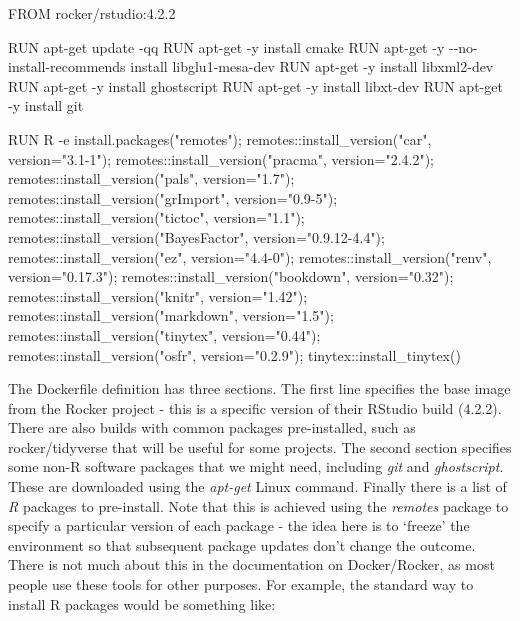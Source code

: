 \documentclass[
]{article}
\newenvironment{Shaded}{\begin{snugshade}}{\end{snugshade}}
\newcommand{\AttributeTok}[1]{\textcolor[rgb]{0.77,0.63,0.00}{#1}}
\newcommand{\ExtensionTok}[1]{#1}
\newcommand{\NormalTok}[1]{#1}
\newcommand{\StringTok}[1]{\textcolor[rgb]{0.31,0.60,0.02}{#1}}
\begin{document}
\begin{Shaded}
\begin{Highlighting}[]

\ExtensionTok{FROM}\NormalTok{ rocker/rstudio:4.2.2}

\ExtensionTok{RUN}\NormalTok{ apt{-}get update }\AttributeTok{{-}qq}
\ExtensionTok{RUN}\NormalTok{ apt{-}get }\AttributeTok{{-}y}\NormalTok{ install cmake}
\ExtensionTok{RUN}\NormalTok{ apt{-}get }\AttributeTok{{-}y} \AttributeTok{{-}{-}no{-}install{-}recommends}\NormalTok{ install libglu1{-}mesa{-}dev}
\ExtensionTok{RUN}\NormalTok{ apt{-}get }\AttributeTok{{-}y}\NormalTok{ install libxml2{-}dev}
\ExtensionTok{RUN}\NormalTok{ apt{-}get }\AttributeTok{{-}y}\NormalTok{ install ghostscript}
\ExtensionTok{RUN}\NormalTok{ apt{-}get }\AttributeTok{{-}y}\NormalTok{ install libxt{-}dev}
\ExtensionTok{RUN}\NormalTok{ apt{-}get }\AttributeTok{{-}y}\NormalTok{ install git}

\ExtensionTok{RUN}\NormalTok{ R }\AttributeTok{{-}e} \StringTok{\textquotesingle{}install.packages("remotes"); remotes::install\_version("car", version="3.1{-}1"); }
\StringTok{remotes::install\_version("pracma", version="2.4.2"); }
\StringTok{remotes::install\_version("pals", version="1.7"); }
\StringTok{remotes::install\_version("grImport", version="0.9{-}5");}
\StringTok{remotes::install\_version("tictoc", version="1.1");}
\StringTok{remotes::install\_version("BayesFactor", version="0.9.12{-}4.4");}
\StringTok{remotes::install\_version("ez", version="4.4{-}0"); }
\StringTok{remotes::install\_version("renv", version="0.17.3");}
\StringTok{remotes::install\_version("bookdown", version="0.32");}
\StringTok{remotes::install\_version("knitr", version="1.42");}
\StringTok{remotes::install\_version("markdown", version="1.5");}
\StringTok{remotes::install\_version("tinytex", version="0.44"); }
\StringTok{remotes::install\_version("osfr", version="0.2.9"); }
\StringTok{tinytex::install\_tinytex()\textquotesingle{}}
\end{Highlighting}
\end{Shaded}

The Dockerfile definition has three sections. The first line specifies the base image from the Rocker project - this is a specific version of their RStudio build (4.2.2). There are also builds with common packages pre-installed, such as rocker/tidyverse that will be useful for some projects. The second section specifies some non-R software packages that we might need, including \emph{git} and \emph{ghostscript}. These are downloaded using the \emph{apt-get} Linux command. Finally there is a list of \emph{R} packages to pre-install. Note that this is achieved using the \emph{remotes} package to specify a particular version of each package - the idea here is to `freeze' the environment so that subsequent package updates don't change the outcome. There is not much about this in the documentation on Docker/Rocker, as most people use these tools for other purposes. For example, the standard way to install R packages would be something like:
\end{document}
